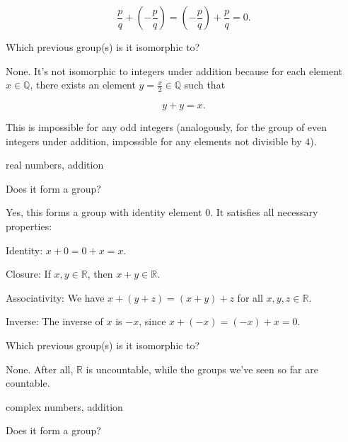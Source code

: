 \documentclass[../key.tex]{subfiles}
\begin{document}
$$\frac{p}{q}+\left(-\frac{p}{q}\right)=\left(-\frac{p}{q}\right)+\frac{p}{q}=0.$$

\begin{iinner_problem}
\item Which previous group(s) is it isomorphic to?
\end{iinner_problem}

\noindent None. It's not isomorphic to integers under addition because for each element $x\in \mathbb{Q}$, there exists an element $y=\frac{x}{2}\in \mathbb{Q}$ such that

$$y+y=x.$$

\noindent This is impossible for any odd integers (analogously, for the group of even integers under addition, impossible for any elements not divisible by $4$).

\begin{inner_problem}
\item real numbers, addition
\end{inner_problem}

\begin{iinner_problem}[start=1]
\item Does it form a group?
\end{iinner_problem}

\noindent Yes, this forms a group with identity element $0$. It satisfies all necessary properties:

Identity: $x+0=0+x=x$.

Closure: If $x,y\in \mathbb{R}$, then $x+y\in \mathbb{R}$.

Associativity: We have $x+(y+z)=(x+y)+z$ for all $x,y,z \in \mathbb{R}$.

Inverse: The inverse of $x$ is $-x$, since $x+(-x)=(-x)+x=0$.

\begin{iinner_problem}
\item Which previous group(s) is it isomorphic to?
\end{iinner_problem}

\noindent None. After all, $\mathbb{R}$ is uncountable, while the groups we've seen so far are countable.

\begin{inner_problem}
\item complex numbers, addition
\end{inner_problem}

\begin{iinner_problem}[start=1]
\item Does it form a group?
\end{iinner_problem}
\end{document}
